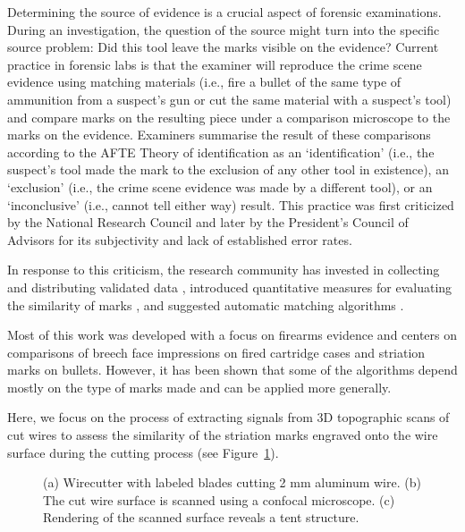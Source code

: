 \documentclass[
  authoryear,
  preprint,
  5p,
  twocolumn]{elsarticle}
\begin{document}
Determining the source of evidence is a crucial aspect of forensic
examinations. During an investigation, the question of the source might
turn into the specific source problem: Did this tool leave the marks
visible on the evidence? Current practice in forensic labs is that the
examiner will reproduce the crime scene evidence using matching
materials (i.e., fire a bullet of the same type of ammunition from a
suspect's gun or cut the same material with a suspect's tool) and
compare marks on the resulting piece under a comparison microscope to
the marks on the evidence. Examiners summarise the result of these
comparisons according to the AFTE Theory of identification \citep{afte}
as an `identification' (i.e., the suspect's tool made the mark to the
exclusion of any other tool in existence), an `exclusion' (i.e., the
crime scene evidence was made by a different tool), or an `inconclusive'
(i.e., cannot tell either way) result. This practice was first
criticized by the National Research Council \citep{nas2009} and later by
the President's Council of Advisors \citep{pcast} for its subjectivity
and lack of established error rates.

In response to this criticism, the research community has invested in
collecting and distributing validated data
\citep{maNISTBulletSignature2004, zhengNISTBallisticsToolmark2016},
introduced quantitative measures for evaluating the similarity of marks
\citep{chuAutomaticIdentificationBullet2013, vorburgerApplicationsCrosscorrelationFunctions2011},
and suggested automatic matching algorithms
\citep{hareAutomaticMatchingBullet2017, taiFullyAutomaticMethod2018, baiker-sorensenAutomatedInterpretationComparison2023}.

Most of this work was developed with a focus on firearms evidence and
centers on comparisons of breech face impressions on fired cartridge
cases and striation marks on bullets. However, it has been shown
\citep{cuellarRevolutionizingForensicToolmark2023, krishnanAdaptingChumbleyScore2019}
that some of the algorithms depend mostly on the type of marks made and
can be applied more generally.

Here, we focus on the process of extracting signals from 3D topographic
scans of cut wires to assess the similarity of the striation marks
engraved onto the wire surface during the cutting process (see
Figure~\ref{fig-overview}).

\begin{figure}


\caption{\label{fig-overview}(a) Wirecutter with labeled blades cutting
2 mm aluminum wire. (b) The cut wire surface is scanned using a confocal
microscope. (c) Rendering of the scanned surface reveals a tent
structure.}

\end{figure}%
\end{document}
